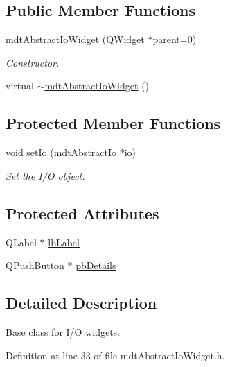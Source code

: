 \subsection*{Public Member Functions}
\begin{DoxyCompactItemize}
\item 
\hyperlink{classmdt_abstract_io_widget_a43208dbc9b2948561f5840bcd8fb9128}{mdt\-Abstract\-Io\-Widget} (\hyperlink{class_q_widget}{Q\-Widget} $\ast$parent=0)
\begin{DoxyCompactList}\small\item\em Constructor. \end{DoxyCompactList}\item 
virtual \hyperlink{classmdt_abstract_io_widget_a6808a8dd8618d2d9e0ecd59d94ec8e1c}{$\sim$mdt\-Abstract\-Io\-Widget} ()
\end{DoxyCompactItemize}
\subsection*{Protected Member Functions}
\begin{DoxyCompactItemize}
\item 
void \hyperlink{classmdt_abstract_io_widget_ad6a9374234c5450dbfd261dfa43d628c}{set\-Io} (\hyperlink{classmdt_abstract_io}{mdt\-Abstract\-Io} $\ast$io)
\begin{DoxyCompactList}\small\item\em Set the I/\-O object. \end{DoxyCompactList}\end{DoxyCompactItemize}
\subsection*{Protected Attributes}
\begin{DoxyCompactItemize}
\item 
Q\-Label $\ast$ \hyperlink{classmdt_abstract_io_widget_aad383dab877e327dc910a1f01ff5a3d9}{lb\-Label}
\item 
Q\-Push\-Button $\ast$ \hyperlink{classmdt_abstract_io_widget_a9dc1ad3754eb3e00c50bfba014e887f3}{pb\-Details}
\end{DoxyCompactItemize}


\subsection{Detailed Description}
Base class for I/\-O widgets. 

Definition at line 33 of file mdt\-Abstract\-Io\-Widget.\-h.



